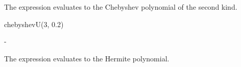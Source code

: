 {{{{{{{{{{{\begin{xtc}
\begin{xtccomment}
The expression  evaluates to the  Chebyshev
polynomial of the second kind.
\end{xtccomment}
\begin{spadsrc}
\end{spadsrc}
\begin{TeXOutput}
\begin{fricasmath}{10}
%
\end{fricasmath}
\end{TeXOutput}
\end{xtc}
\begin{xtc}
\begin{xtccomment}
\end{xtccomment}
\begin{spadsrc}
chebyshevU(3, 0.2)
\end{spadsrc}
\begin{TeXOutput}
\begin{fricasmath}{11}
-{}%
\end{fricasmath}
\end{TeXOutput}
\end{xtc}
\begin{xtc}
\begin{xtccomment}
The expression  evaluates to the  Hermite
polynomial.
\end{xtccomment}
\begin{spadsrc}
\end{spadsrc}
\begin{TeXOutput}
\begin{fricasmath}{12}
%
\end{fricasmath}
\end{TeXOutput}

\end{xtc}}}}}}}}}}}}
